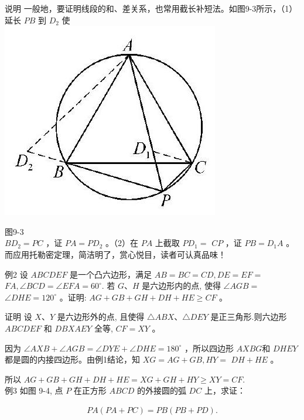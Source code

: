 \documentclass[10pt]{article}
\begin{document}
说明 一般地，要证明线段的和、差关系，也常用截长补短法。如图9-3所示，（1）延长 $P B$ 到 $D_{2}$ 使\\
\includegraphics[max width=\textwidth, center]{2024_10_30_66b8e5e701da2093c133g-066(1)}

图9-3\\
$B D_{2}=P C$ ，证 $P A=P D_{2}$ 。（2）在 $P A$ 上截取 $P D_{1}=$ $C P$ ，证 $P B=D_{1} A$ 。而应用托勒密定理，简洁明了，赏心悦目，读者可认真品味！

例2 设 $A B C D E F$ 是一个凸六边形，满足 $A B=B C=C D, D E=E F=$ $F A, \angle B C D=\angle E F A=60^{\circ}$. 若 $G 、 H$ 是六边形内的点, 使得 $\angle A G B=$ $\angle D H E=120^{\circ}$ 。证明: $A G+G B+G H+D H+H E \geqslant C F$ 。

证明 设 $X 、 Y$ 是六边形外的点, 且使得 $\triangle A B X 、 \triangle D E Y$ 是正三角形.则六边形 $A B C D E F$ 和 $D B X A E Y$ 全等, $C F=X Y$ 。

因为 $\angle A X B+\angle A G B=\angle D Y E+\angle D H E=180^{\circ}$ ，所以四边形 $A X B G$和 $D H E Y$ 都是圆的内接四边形。由例1结论，知 $X G=A G+G B, H Y=$ $D H+H E$ 。

所以 $A G+G B+G H+D H+H E=X G+G H+H Y \geqslant X Y=C F$.\\
例3 如图 9-4, 点 $P$ 在正方形 $A B C D$ 的外接圆的弧 $D C$ 上，求证：

\begin{align*}
P A(P A+P C)=P B(P B+P D) .
\end{align*}
\end{document}
